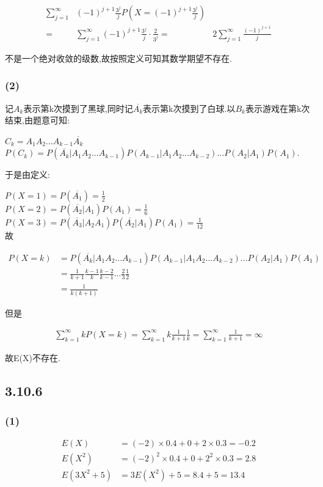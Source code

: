 \documentclass[12pt,a4paper,fontset=none]{ctexart}
\begin{document}
\begin{align*}
	\sum_{j=1}^{\infty} & (-1)^{j+1}\frac{3^j}{j}P(X=(-1)^{j+1}\frac{3^j}{j} )          \\
	=                   & \sum_{j=1}^{\infty}(-1)^{j+1}\frac{3^j}{j}\cdot \frac{2}{3^j}
	=                   & 2\sum_{j=1}^{\infty}\frac{(-1)^{j+1}}{j}
\end{align*}

不是一个绝对收敛的级数,故按照定义可知其数学期望不存在.

\subsubsection*{(2)}
记$A_k$表示第k次摸到了黑球,同时记$\overline{A_k}$表示第k次摸到了白球.以$B_k$表示游戏在第k次结束,由题意可知:

$C_k=A_1A_2...A_{k-1}\overline{A_k}$\\
$P(C_k)=P(\overline{A_k}|A_1A_2...A_{k-1})P(A_{k-1}|A_1A_2...A_{k-2})...P(A_2|A_1)P(A_1)$.

于是由定义:

$P(X=1)=P(\overline{A_1})=\frac{1}{2} $\\
$P(X=2)=P(\overline{A_2}|A_1)P(A_1)=\frac{1}{6} $\\
$P(X=3)=P(\overline{A_3}|A_2A_1)P(\overline{A_2}|A_1)P(A_1)=\frac{1}{12} $\\
故

\begin{align*}
	P(X=k) & =P(\overline{A_k}|A_1A_2...A_{k-1})P(A_{k-1}|A_1A_2...A_{k-2})...P(A_2|A_1)P(A_1) \\
	       & =\frac{1}{k+1}\frac{k-1}{k}\frac{k-2}{k-1}...\frac{2}{3}\frac{1}{2}               \\
	       & =\frac{1}{k(k+1)}
\end{align*}

但是

\begin{align*}
	\sum_{k=1}^{\infty}kP(X=k)=\sum_{k=1}^{\infty}k\frac{1}{k+1}\frac{1}{k}=\sum_{k=1}^{\infty}\frac{1}{k+1}=\infty
\end{align*}

故E(X)不存在.
\subsection*{3.10.6}
\subsubsection*{(1)}
\begin{align*}
	E(X)      & =(-2)\times 0.4+0+2\times 0.3=-0.2    \\
	E(X^2)    & =(-2)^2\times 0.4+0+2^2\times 0.3=2.8 \\
	E(3X^2+5) & =3E(X^2)+5=8.4+5=13.4
\end{align*}
\end{document}
